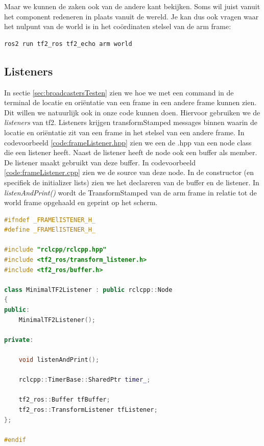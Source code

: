 \noindent Maar we kunnen de zaken ook van de andere kant bekijken. Soms wil juist vanuit het component redeneren in plaats vanuit de wereld. Je kan dus ook vragen waar het nulpunt van de world is in het coördinaten stelsel van de arm frame:

\begin{lstlisting}[style=DOS, caption=Hello world, firstnumber=0, label={}]
ros2 run tf2_ros tf2_echo arm world
\end{lstlisting}


\subsection{Listeners}\label{sec:listeners}
In sectie \ref{sec:broadcastersTesten} zien we hoe we met een command in de terminal de locatie en oriëntatie van een frame in een andere frame kunnen zien. Dit willen we natuurlijk ook in onze code kunnen doen. Hiervoor gebruiken we de \textit{listeners} van tf2. Listeners krijgen transformStamped messages binnen waarin de locatie en oriëntatie zit van een frame in het stelsel van een andere frame. In codevoorbeeld \ref{code:frameListener.hpp} zien we een de .hpp van een node class die een listener heeft. Naast de listener heeft de node ook een buffer als member. De listener maakt gebruikt van deze buffer. In codevoorbeeld \ref{code:frameListener.cpp} zien we de source van deze node. In de constructor (en specifiek de initializer lists) zien we het declareren van de buffer en de listener. In \textit{listenAndPrint()} wordt de TransformStamped van de arm frame in relatie tot de world frame opgehaald en geprint op het scherm.

\begin{lstlisting}[language=C++, caption={frameListener.hpp; De header file van een node met een listener.}, firstnumber=0, label={code:frameListener.hpp}]
#ifndef _FRAMElISTENER_H_
#define _FRAMElISTENER_H_

#include "rclcpp/rclcpp.hpp"
#include <tf2_ros/transform_listener.h>
#include <tf2_ros/buffer.h>

class MinimalTF2Listener : public rclcpp::Node
{
public:
    MinimalTF2Listener();

private:

    void listenAndPrint();

    rclcpp::TimerBase::SharedPtr timer_;

    tf2_ros::Buffer tfBuffer;
    tf2_ros::TransformListener tfListener;
};

#endif

\end{lstlisting}


